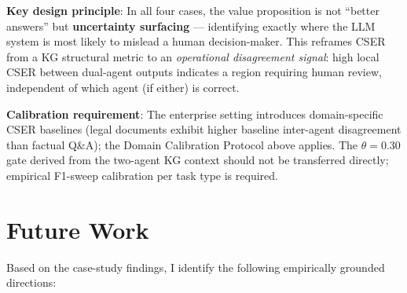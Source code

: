 \documentclass[12pt]{article}
\begin{document}
\textbf{Key design principle}: In all four cases, the value proposition is not
``better answers'' but \textbf{uncertainty surfacing} --- identifying exactly where
the LLM system is most likely to mislead a human decision-maker.
This reframes CSER from a KG structural metric to an \emph{operational
disagreement signal}: high local CSER between dual-agent outputs indicates
a region requiring human review, independent of which agent (if either) is correct.

\textbf{Calibration requirement}: The enterprise setting introduces domain-specific
CSER baselines (legal documents exhibit higher baseline inter-agent disagreement than
factual Q\&A); the Domain Calibration Protocol above applies.
The $\theta = 0.30$ gate derived from the two-agent KG context should not be
transferred directly; empirical F1-sweep calibration per task type is required.

\section*{Future Work}
\label{sec:future}

Based on the case-study findings, I identify the following empirically grounded directions:
\end{document}
